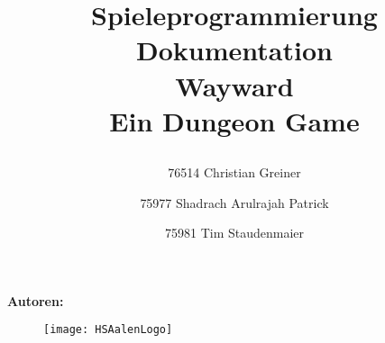 


\title{\begin{center}\fontsize{40bp}{40bp}\selectfont\color{DarkBlue}
Spieleprogrammierung Dokumentation \\ [20pt]
\color{black}
\fontsize{16bp}{16bp}\selectfont
\fontsize{30bp}{30bp}\selectfont
\color{LightBlue}
Wayward\\
\fontsize{10bp}{10bp}\selectfont
\color{black}
\bigskip
Ein Dungeon Game
\end{center}
}
\maketitle

\date{}
\begin{center}
\textbf{\fontsize{12bp}{12bp}\selectfont
Autoren:\\}
\bigskip
\author{ 76514 Christian Greiner\\
\and 75977 Shadrach Arulrajah Patrick\\
\and 75981 Tim Staudenmaier
}
\end{center}
\begin{figure}
\centering
\texttt{[image: HSAalenLogo]}
\end{figure}

\newpage
			

\setcounter{page}{1} %

{\hypersetup{linkcolor=black}
\tableofcontents
}
\newpage